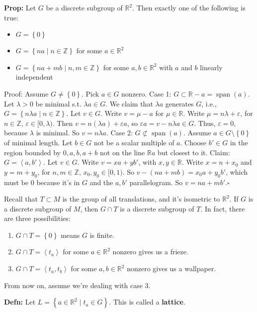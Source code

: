 \documentclass[10pt,letterpaper]{article}
\newcommand{\n}{\hfill\break}
\newcommand{\up}{\vspace{-\baselineskip}}
\newcommand{\hangblock}[2]{\par\noindent\settowidth{\hangindent}{\textbf{#1: }}\textbf{#1: }\!\!\!#2}
\newcommand{\defn}[1]{\hangblock{Defn}{#1}}
\newcommand{\prop}[1]{\hangblock{Prop}{#1}}
\newcommand{\proven}{\;$\square$\n}
\newcommand{\set}[1]{\left\{#1\right\}}
\newcommand{\integers}{\mathbb{Z}}
\newcommand{\Z}{\integers}
\newcommand{\reals}{\mathbb{R}}
\newcommand{\R}{\reals}
\newcommand{\cut}{\setminus}
\DeclareMathOperator{\vspan}{span}
\newcommand{\generated}[1]{\left<#1\right>}
\newcommand{\st}{s.t.}
\begin{document}
\prop{
	Let $G$ be a discrete subgroup of $\R^{2}$. Then exactly one of the following is true:
	\begin{itemize}[leftmargin=4\parindent]
		\item $G=\set{0}$
		\item $G=\set{na\mid{}n\in\Z}$ for some $a\in\R^{2}$
		\item $G=\set{na+mb\mid{}n,m\in\Z}$ for some $a,b\in\R^{2}$ with $a$ and $b$ linearly independent
	\end{itemize}\up\n
	Proof: Assume $G\ne\set{0}$. Pick $a\in{}G$ nonzero.\n
	\n
	Case 1: $G\subset\R-a=\vspan(a)$. Let $\lambda>0$ be minimal \st{} $\lambda{}a\in{}G$. We claim that $\lambda{}a$ generates $G$, i.e., $G=\set{n\lambda{}a\mid{}n\in\Z}$. Let $v\in{}G$. Write $v=\mu-a$ for $\mu\in\R$. Write $\mu=n\lambda+\varepsilon$, for $n\in\Z$, $\varepsilon\in[0,\lambda)$. Then $v=n(\lambda{}a)+\varepsilon{}a$, so $\varepsilon{}a=v-n\lambda{}a\in{}G$. Thus, $\varepsilon=0$, because $\lambda$ is minimal. So $v=n\lambda{}a$.\n
	\n
	Case 2: $G\not\subset\vspan(a)$. Assume $a\in{}G\cut\set{0}$ of minimal length. Let $b\in{}G$ not be a scalar multiple of $a$. Choose $b'\in{}G$ in the region bounded by $0,a,b,a+b$ not on the line $\R{}a$ but closest to it. Claim: $G=\generated{a,b'}$. Let $v\in{}G$. Write $v=xa+yb'$, with $x,y\in\R$. Write $x=n+x_{0}$ and $y=m+y_{0}$, for $n,m\in\Z$, $x_{0},y_{0}\in[0,1)$. So $v-(na+mb)=x_{0}a+y_{0}b'$, which must be $0$ because it's in $G$ and the $a,b'$ parallelogram. So $v=na+mb'$.\proven
}

\par\noindent
Recall that $T\subset{}M$ is the group of all translations, and it's isometric to $\R^{2}$. If $G$ is a discrete subgroup of $M$, then $G\cap{}T$ is a discrete subgroup of $T$.\n
In fact, there are three possibilities:
\begin{enumerate}
	\item $G\cap{}T=\set{0}$ means $G$ is finite.
	\item $G\cap{}T=\generated{t_{a}}$ for some $a\in\R^{2}$ nonzero gives us a frieze.
	\item $G\cap{}T=\generated{t_{a},t_{b}}$ for some $a,b\in\R^{2}$ nonzero gives us a wallpaper.
\end{enumerate}

\par\noindent
From now on, assume we're dealing with case 3.\n

\defn{
	Let $L=\set{a\in\R^{2}\mid{}t_{a}\in{}G}$. This is called a \textbf{lattice}.\n
}
\end{document}
